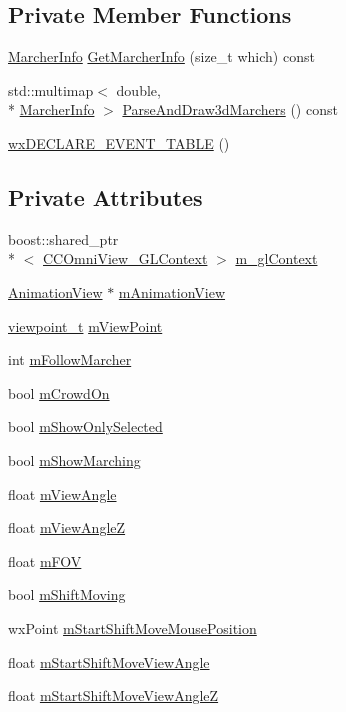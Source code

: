 \subsection*{Private Member Functions}
\begin{DoxyCompactItemize}
\item 
\hyperlink{a00110}{Marcher\-Info} \hyperlink{a00049_a44d29f5d38915f81d5231d78ac1a9eff}{Get\-Marcher\-Info} (size\-\_\-t which) const 
\item 
std\-::multimap$<$ double, \\*
\hyperlink{a00110}{Marcher\-Info} $>$ \hyperlink{a00049_aeda29351fb385ead8782a5dbdb3ddc79}{Parse\-And\-Draw3d\-Marchers} () const 
\item 
\hyperlink{a00049_a7a31d190a1e2ac6b51271ae7fde31d36}{wx\-D\-E\-C\-L\-A\-R\-E\-\_\-\-E\-V\-E\-N\-T\-\_\-\-T\-A\-B\-L\-E} ()
\end{DoxyCompactItemize}
\subsection*{Private Attributes}
\begin{DoxyCompactItemize}
\item 
boost\-::shared\-\_\-ptr\\*
$<$ \hyperlink{a00050}{C\-C\-Omni\-View\-\_\-\-G\-L\-Context} $>$ \hyperlink{a00049_a670422a2848a70cb52833a81061d990f}{m\-\_\-gl\-Context}
\item 
\hyperlink{a00015}{Animation\-View} $\ast$ \hyperlink{a00049_a6dc444adcccf109a636a4a8e5a3678c4}{m\-Animation\-View}
\item 
\hyperlink{a00154}{viewpoint\-\_\-t} \hyperlink{a00049_a68343cb2899d80c9cfc2053855232d3c}{m\-View\-Point}
\item 
int \hyperlink{a00049_a8ceffb3a7cd246765733c66cb1c794bb}{m\-Follow\-Marcher}
\item 
bool \hyperlink{a00049_af92114fc4626c7722ac50d5cdef22aad}{m\-Crowd\-On}
\item 
bool \hyperlink{a00049_a43acf3227cea9248543f2bcf955729f8}{m\-Show\-Only\-Selected}
\item 
bool \hyperlink{a00049_aed16d914b6dda9bb645e1e446fb70328}{m\-Show\-Marching}
\item 
float \hyperlink{a00049_a9aca6bb139d6088dc7a7d8b7769f653d}{m\-View\-Angle}
\item 
float \hyperlink{a00049_a187edb8b5697afd4ee616aab3400ea0e}{m\-View\-Angle\-Z}
\item 
float \hyperlink{a00049_a8c9ff38d651a4904b03f2a8a7995a3cd}{m\-F\-O\-V}
\item 
bool \hyperlink{a00049_a23011207227bebad7820a18caeaaa5fd}{m\-Shift\-Moving}
\item 
wx\-Point \hyperlink{a00049_a46bdf62d324feaf9c910ee8f5dee54e5}{m\-Start\-Shift\-Move\-Mouse\-Position}
\item 
float \hyperlink{a00049_a35c4764e86ce06efe20dab012ca2af53}{m\-Start\-Shift\-Move\-View\-Angle}
\item 
float \hyperlink{a00049_a5123da690cd5542692b58bbbfc189463}{m\-Start\-Shift\-Move\-View\-Angle\-Z}
\end{DoxyCompactItemize}


